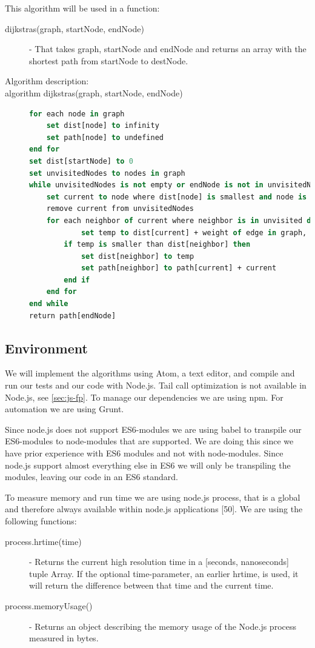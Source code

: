 \documentclass {article}
\begin{document}
This algorithm will be used in a function:
\begin{description}
\item[dijkstras(graph, startNode, endNode)] - That takes graph, startNode and endNode and returns an array with the shortest path from startNode to destNode. 

\item [Algorithm description:]
\item[algorithm dijkstras(graph, startNode, endNode)]
\item[]
\begin{lstlisting}[language=Pascal]
for each node in graph
 	set dist[node] to infinity 
 	set path[node] to undefined 
end for
set dist[startNode] to 0 
set unvisitedNodes to nodes in graph
while unvisitedNodes is not empty or endNode is not in unvisitedNodes do
 	set current to node where dist[node] is smallest and node is in unvisitedNodes
 	remove current from unvisitedNodes
  	for each neighbor of current where neighbor is in unvisited do
    		set temp to dist[current] + weight of edge in graph, where edge is from current to neighbor
 		if temp is smaller than dist[neighbor] then
 			set dist[neighbor] to temp
 			set path[neighbor] to path[current] + current
 		end if
 	end for
end while
return path[endNode]
\end{lstlisting}
\end{description}
\subsection{Environment}
We will implement the algorithms using Atom, a text editor, and compile and run our tests and our code with Node.js. Tail call optimization is not available in Node.js, see \ref{sec:js-fp}. To manage our dependencies we are using npm. For automation we are using Grunt.

Since node.js does not support ES6-modules we are using babel to transpile our ES6-modules to node-modules that are supported. We are doing this since we have prior experience with ES6 modules and not with node-modules. Since node.js support almost everything else in ES6 we will only be transpiling the modules, leaving our code in an ES6 standard.

To measure memory and run time we are using node.js process, that is a global and therefore always available within node.js applications [50]. We are using the following functions:
\begin{description}
\item [process.hrtime(time)] - Returns the current high resolution time in a [seconds, nanoseconds] tuple Array. If the optional time-parameter, an earlier hrtime, is used, it will return the difference between that time and the current time. 
\item [process.memoryUsage()] - Returns an object describing the memory usage of the Node.js process measured in bytes.
\end{description}
\end{document}
